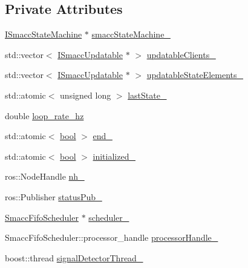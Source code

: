 \subsection*{Private Attributes}
\begin{DoxyCompactItemize}
\item 
\hyperlink{classsmacc_1_1ISmaccStateMachine}{I\+Smacc\+State\+Machine} $\ast$ \hyperlink{classsmacc_1_1SignalDetector_a46025de6ac7b5980e22144f9703236a4}{smacc\+State\+Machine\+\_\+}
\item 
std\+::vector$<$ \hyperlink{classsmacc_1_1ISmaccUpdatable}{I\+Smacc\+Updatable} $\ast$ $>$ \hyperlink{classsmacc_1_1SignalDetector_a01a457b4ec935473d6426efb7b87e683}{updatable\+Clients\+\_\+}
\item 
std\+::vector$<$ \hyperlink{classsmacc_1_1ISmaccUpdatable}{I\+Smacc\+Updatable} $\ast$ $>$ \hyperlink{classsmacc_1_1SignalDetector_a07a5e7bb00c348435d954e22682fa610}{updatable\+State\+Elements\+\_\+}
\item 
std\+::atomic$<$ unsigned long $>$ \hyperlink{classsmacc_1_1SignalDetector_a72293ed0e98f4200fbe75b53f1e41eab}{last\+State\+\_\+}
\item 
double \hyperlink{classsmacc_1_1SignalDetector_a41a2ae4262ed350f46d8b886bdc1dfa5}{loop\+\_\+rate\+\_\+hz}
\item 
std\+::atomic$<$ \hyperlink{classbool}{bool} $>$ \hyperlink{classsmacc_1_1SignalDetector_aaee266393c01693528a2d74b1f2354a2}{end\+\_\+}
\item 
std\+::atomic$<$ \hyperlink{classbool}{bool} $>$ \hyperlink{classsmacc_1_1SignalDetector_a1b3c54963799b538078619906edd5302}{initialized\+\_\+}
\item 
ros\+::\+Node\+Handle \hyperlink{classsmacc_1_1SignalDetector_a5c416677fd537afc79f2fbc2e68b2dee}{nh\+\_\+}
\item 
ros\+::\+Publisher \hyperlink{classsmacc_1_1SignalDetector_ae065bbd4e699e5fce00fbc508dedd4c1}{status\+Pub\+\_\+}
\item 
\hyperlink{smacc__fifo__scheduler_8h_a0063e275231c80d5f97df21d17257bf7}{Smacc\+Fifo\+Scheduler} $\ast$ \hyperlink{classsmacc_1_1SignalDetector_adaee5b9b91d0e6305dc1ab30f7ab566d}{scheduler\+\_\+}
\item 
Smacc\+Fifo\+Scheduler\+::processor\+\_\+handle \hyperlink{classsmacc_1_1SignalDetector_a9a77dc9f0e9f8f56dff5e76077abcb78}{processor\+Handle\+\_\+}
\item 
boost\+::thread \hyperlink{classsmacc_1_1SignalDetector_a4346a400cd37eafc5d1d2e63d975785e}{signal\+Detector\+Thread\+\_\+}
\end{DoxyCompactItemize}



